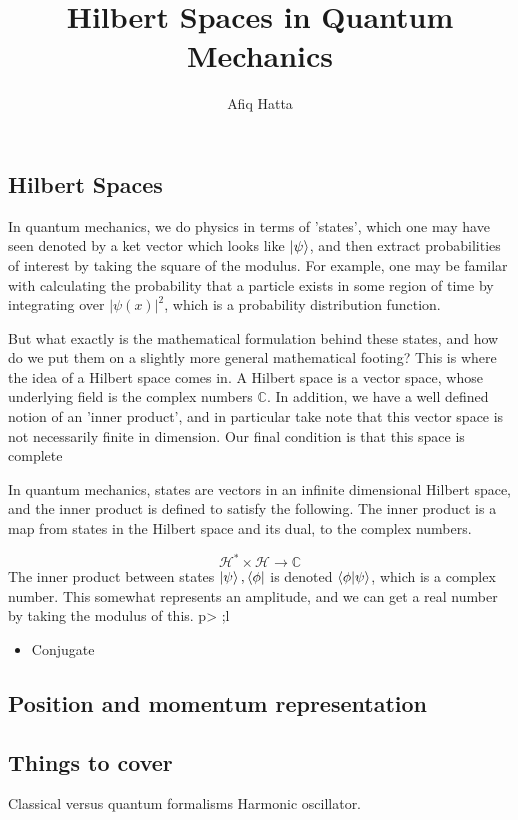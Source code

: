 \documentclass[11pt, a4paper]{article}   	%
\author{Afiq Hatta}
\title{Hilbert Spaces in Quantum Mechanics}
\begin{document}
\maketitle

\begin{multicols}{2}

\section{Hilbert Spaces} 
In quantum mechanics, we do physics in terms of 'states', which one may have seen denoted by a ket vector which looks like $\ket{\psi}$, and then extract probabilities of interest by taking the square of the modulus. For example, one may be familar with calculating the probability that a particle exists in some region of time by integrating over $|\psi(x)|^2$, which is a probability distribution function.

But what exactly is the mathematical formulation behind these states, and how do we put them on a slightly more general mathematical footing? This is where the idea of a Hilbert space comes in. A Hilbert space is a vector space, whose underlying field is the complex numbers $\mathbb{C}$. In addition, we have a well defined notion of an 'inner product', and in particular take note that this vector space is not necessarily finite in dimension. Our final condition is that this space is complete  

In quantum mechanics, states are vectors in an infinite dimensional Hilbert space, and the inner product is defined to satisfy the following. The inner product is a map from states in the Hilbert space and its dual, to the complex numbers. 

\[ 
	\mathcal{H}^* \times \mathcal{H} \rightarrow \mathbb{C} 
\] 
The inner product between states $\ket{\psi}, \bra{\phi}$ is denoted $\bra{\phi}\ket{\psi}$, which is a complex number. This somewhat represents an amplitude, and we can get a real number by taking the modulus of this. 
p> ;l
\begin{itemize} 
\item Conjugate
\end{itemize}
\subsection{Position and momentum representation} 

\subsection{Things to cover} 
Classical versus quantum formalisms
Harmonic oscillator.  
\end{multicols} 
\end{document}
